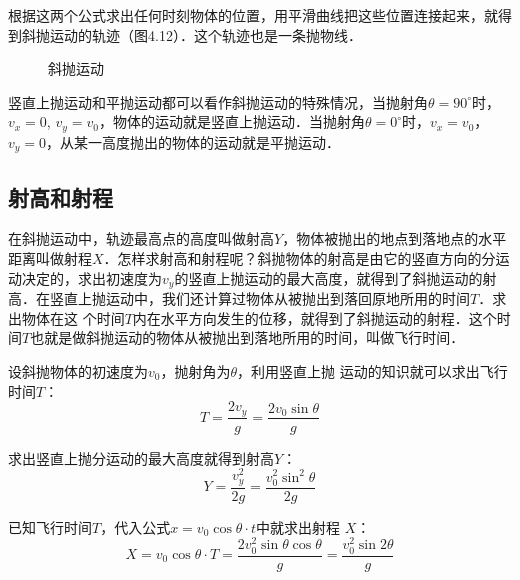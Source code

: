 根据这两个公式求出任何时刻物体的位置，用平滑曲线把这些位置连接起来，就得到斜抛运动的轨迹（图4.12）．这个轨迹也是一条抛物线．

\begin{figure}[htp]\centering
{}
\caption{斜抛运动}
\end{figure}


竖直上抛运动和平抛运动都可以看作斜抛运动的特殊情况，当抛射角$\theta=90^{\circ}$时，$v_x=0$, $v_y=v_0$，物体的运动就是竖直上抛运动．当抛射角$\theta =0^{\circ}$时，$v_x=v_0$，$v_y=0$，从某一高度抛出的物体的运动就是平抛运动．

\subsection{射高和射程} 

在斜抛运动中，轨迹最高点的高度叫做射高$Y$，物体被抛出的地点到落地点的水平距离叫做射程$X$．怎样求射高和射程呢？斜抛物体的射高是由它的竖直方向的分运动决定的，求出初速度为$v_y$的竖直上抛运动的最大高度，就得到了斜抛运动的射高．在竖直上抛运动中，我们还计算过物体从被抛出到落回原地所用的时间$T$．求出物体在这
个时间$T$内在水平方向发生的位移，就得到了斜抛运动的射程．这个时间$T$也就是做斜抛运动的物体从被抛出到落地所用的时间，叫做飞行时间．

    设斜抛物体的初速度为$v_0$，抛射角为$\theta$，利用竖直上抛
运动的知识就可以求出飞行时间$T$：
\[T=\frac{2v_y}{g}=\frac{2v_0\sin\theta}{g} \]

求出竖直上抛分运动的最大高度就得到射高$Y$：
\[Y=\frac{v^2_y}{2g}=\frac{v_0^2\sin^2\theta}{2g} \]

已知飞行时间$T$，代入公式$x=v_0\cos\theta \cdot t$中就求出射程
$X$：
\[X=v_0\cos\theta \cdot T=\frac{2v_0^2\sin\theta \cos\theta}{g}=\frac{v_0^2\sin 2\theta}{g} \]

